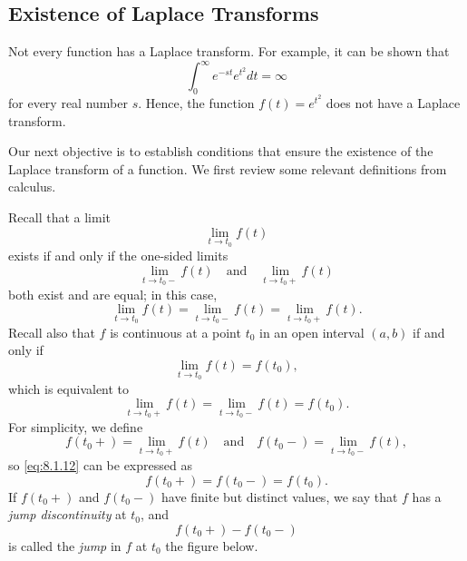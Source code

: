 \documentclass{ximera}
\begin{document}
\subsection*{Existence of Laplace Transforms}

Not every function has a Laplace transform.  For example, it can be shown
that
$$
\int_0^\infty e^{-st}e^{t^2} dt=\infty
$$
for every real number $s$. Hence, the function $f(t)=e^{t^2}$ does not
have a Laplace transform.

Our next objective is to establish conditions that ensure the
existence of the Laplace transform of a function. We first review some
relevant definitions from calculus.

Recall that a limit
$$
\lim_{t\rightarrow t_0} f(t)
$$
exists if and only if the one-sided limits
$$
\lim_{t\rightarrow t_0-}f(t)\quad\mbox{and}\quad\lim_{t\rightarrow t_0+}f(t)
$$
  both exist and are equal;   in this case,
$$
\lim_{t\rightarrow t_0}f(t)=\lim_{t\rightarrow t_0-}f(t)=\lim_{t\rightarrow t_0+}f(t) .
$$
Recall also that $f$ is continuous at a point $t_0$ in an open interval
$(a,b)$ if and only if
$$
\lim_{t\rightarrow t_0}f(t)=f(t_0),
$$
which is  equivalent to
\begin{equation}\label{eq:8.1.12}
\lim_{t\rightarrow t_0+}f(t)=\lim_{t\rightarrow t_0-}f(t)=f(t_0).
\end{equation}
For simplicity, we  define
$$
f(t_0+)=\lim_{t\rightarrow t_0+}f(t)\quad\mbox{and}\quad f(t_0-)=\lim_{t\rightarrow
t_0-}f(t),
$$
so  \eqref{eq:8.1.12} can be expressed as
$$
f(t_0+)=f(t_0-)=f(t_0).
$$
If $f(t_0+)$ and $f(t_0-)$ have finite but distinct values,  we say
that $f$ has a \textit{jump discontinuity}  at $t_0$,
 and
$$
f(t_0+)-f(t_0-)
$$
is called the \textit{jump} in $f$ at $t_0$ the figure below.

\begin{center}
\end{center}
\end{document}
